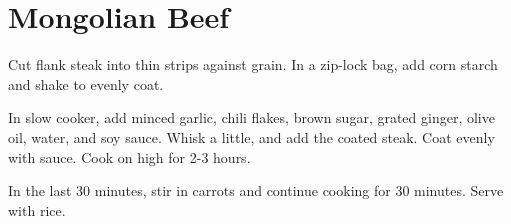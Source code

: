 \section{Mongolian Beef}
\begin{recipe}



	Cut flank steak into thin strips against grain. In a zip-lock bag, add corn starch and shake to evenly coat.

	In slow cooker, add minced garlic, chili flakes, brown sugar, grated ginger, olive oil, water, and soy sauce. Whisk a little, and add the coated steak. Coat evenly with sauce. Cook on high for 2-3 hours.

	In the last 30 minutes, stir in carrots and continue cooking for 30 minutes. Serve with rice.

\end{recipe}
